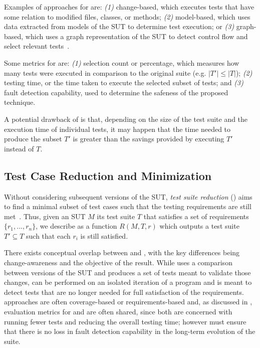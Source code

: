 Examples of approaches for \tcs are: \textit{(1)} change-based, which executes tests that have some relation to modified files, classes, or methods; \textit{(2)} model-based, which uses data extracted from models of the SUT to determine test execution; or \textit{(3)} graph-based, which uses a graph representation of the SUT to detect control flow and select relevant tests~\cite{kazmi_effective_2017}.

Some metrics for \tcs are: \textit{(1)} selection count or percentage, which measures how many tests were executed in comparison to the original suite (e.g. $|T'| \leq |T|$); \textit{(2)} testing time, or the time taken to execute the selected subset of tests; and \textit{(3)} fault detection capability, used to determine the safeness of the proposed technique.

A potential drawback of \tcs is that, depending on the size of the test suite and the execution time of individual tests, it may happen that the time needed to produce the subset $T'$ is greater than the savings provided by executing $T'$ instead of $T$. 

\subsection{Test Case Reduction and Minimization}
\label{sec:tsr}

Without considering subsequent versions of the SUT, \textit{test suite reduction} (\tsr) aims to find a minimal subset of test cases such that the testing requirements are still met~\cite{yoo2012regression}.
Thus, given an SUT $M$ its test suite $T$ that satisfies a set of requirements $\{r_1, ..., r_n\}$, we describe \tsr as a function $R(M, T, r)$ which outputs a test suite $T' \subseteq T$ such that each $r_i$ is still satisfied.

There exists conceptual overlap between \tcs and \tsr, with the key differences being change-awareness and the objective of the result.
While \tcs uses a comparison between versions of the SUT and produces a set of tests meant to validate those changes, \tsr can be performed on an isolated iteration of a program and is meant to detect tests that are no longer needed for full satisfaction of the requirements.
\tsr approaches are often coverage-based or requirements-based and, as discussed in , evaluation metrics for \tcp and \tsr are often shared, since both are concerned with running fewer tests and reducing the overall testing time; however \tsr must ensure that there is no loss in fault detection capability in the long-term evolution of the suite.

